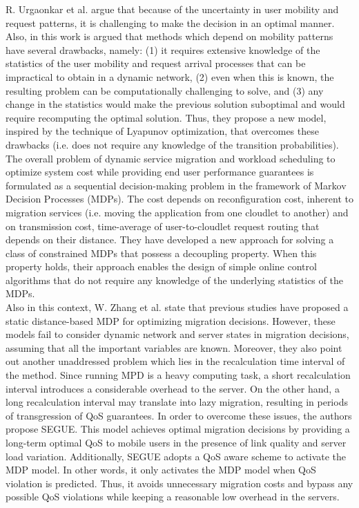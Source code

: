 \noindent\tab R. Urgaonkar et al. \cite{urgaonkar2015dynamic} argue that because of the uncertainty in user mobility and request patterns, it is challenging to make the decision in an optimal manner. Also, in this work is argued that methods which depend on mobility patterns have several drawbacks, namely: (1) it requires extensive knowledge of the statistics of the user mobility and request arrival processes that can be impractical to obtain in a dynamic network, (2) even when this is known, the resulting problem can be computationally challenging to solve, and (3) any change in the statistics would make the previous solution suboptimal and would require recomputing the optimal solution. Thus, they propose a new model, inspired by the technique of Lyapunov optimization, that overcomes these drawbacks (i.e. does not require any knowledge of the transition probabilities). The overall problem of dynamic service migration and workload scheduling to optimize system cost while providing end user performance guarantees is formulated as a sequential decision-making problem in the framework of Markov Decision Processes (MDPs). The cost depends on reconfiguration cost, inherent to migration services (i.e. moving the application from one cloudlet to another) and on transmission cost, time-average of user-to-cloudlet request routing that depends on their distance. They have developed a new approach for solving a class of constrained MDPs that possess a decoupling property. When this property holds, their approach enables the design of simple online control algorithms that do not require any knowledge of the underlying statistics of the MDPs.\\
\noindent\tab Also in this context, W. Zhang et al. \cite{zhang2016segue} state that previous studies have proposed a static distance-based MDP for optimizing migration decisions. However, these models fail to consider dynamic network and server states in migration decisions, assuming that all the important variables are known. Moreover, they also point out another unaddressed problem which lies in the recalculation time interval of the method. Since running MPD is a heavy computing task, a short recalculation interval introduces a considerable overhead to the server. On the other hand, a long recalculation interval may translate into lazy migration, resulting in periods of transgression of QoS guarantees. In order to overcome these issues, the authors propose SEGUE. This model achieves optimal migration decisions by providing a long-term optimal QoS to mobile users in the presence of link quality and server load variation. Additionally, SEGUE adopts a QoS aware scheme to activate the MDP model. In other words, it only activates the MDP model when QoS violation is predicted. Thus, it avoids unnecessary migration costs and bypass any possible QoS violations while keeping a reasonable low overhead in the servers. \\
